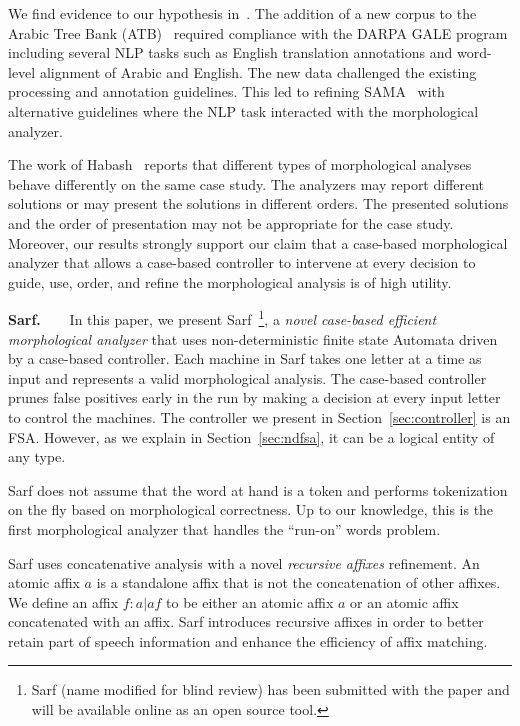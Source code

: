 \documentclass[11pt]{article}
\begin{document}
We find evidence to our hypothesis in~\cite{Maamouri:10}.
The addition of a new corpus to the Arabic Tree Bank 
(ATB)~\cite{Maamouri:04}
required compliance with the DARPA GALE program 
including several NLP tasks such as English translation 
annotations and word-level alignment of Arabic and English. 
The new data challenged the existing processing and 
annotation guidelines. 
This led to refining 
SAMA~\cite{Kulick:10} with 
alternative guidelines where the NLP 
task interacted with the morphological analyzer. 

The work of Habash~ reports that different 
types of morphological analyses behave differently on the same case 
study. 
The analyzers may report different solutions or 
may present the solutions in different orders. 
The presented solutions and the order of presentation may not be 
appropriate for the case study. 
Moreover, our results strongly support our claim that
a case-based morphological analyzer that allows a case-based 
controller to intervene at every decision to guide, use, order, and 
refine the morphological analysis is of high utility.


{\bf Sarf.~~~}
In this paper, we present Sarf~\footnote{Sarf (name modified for blind review) 
has been submitted with the paper and will be available online as an open source tool.},
 a {\em novel case-based efficient
morphological analyzer} that uses 
non-deterministic finite state Automata 
driven by a case-based controller.
Each machine in Sarf takes one letter at a time as input
and represents a valid morphological analysis.
The case-based controller prunes false positives
early in the run by making a decision at every input letter
to control the machines.
The controller we present in Section~\ref{sec:controller}
is an FSA. However, as we explain in Section~\ref{sec:ndfsa},
it can be a logical entity of any type. 

Sarf does not assume that the word at hand is a token and
performs tokenization on the fly based on morphological correctness.
Up to our knowledge, this is the first morphological analyzer that 
handles the ``run-on'' words problem. 

Sarf uses concatenative analysis with a novel 
{\em recursive affixes} refinement. 
An atomic affix $a$ is a standalone affix
that is not the concatenation of other affixes. 
We define an affix $f: a | a f$ to be either
an atomic affix $a$ or an atomic affix concatenated
with an affix. 
Sarf introduces recursive affixes in order to
better retain part of speech information and enhance the 
efficiency of affix matching. 
\end{document}
